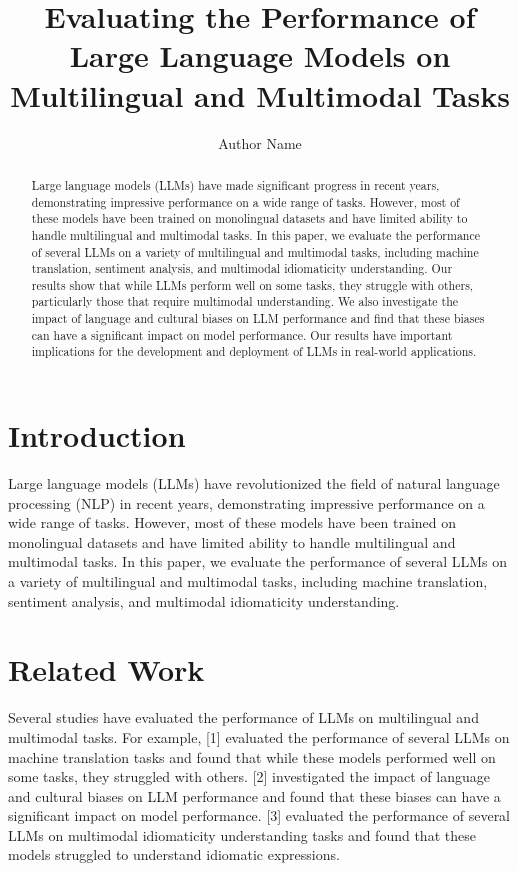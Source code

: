 \documentclass{article}
\begin{document}
\title{Evaluating the Performance of Large Language Models on Multilingual and Multimodal Tasks}

\author{Author Name}

\maketitle

\begin{abstract}
Large language models (LLMs) have made significant progress in recent years, demonstrating impressive performance on a wide range of tasks. However, most of these models have been trained on monolingual datasets and have limited ability to handle multilingual and multimodal tasks. In this paper, we evaluate the performance of several LLMs on a variety of multilingual and multimodal tasks, including machine translation, sentiment analysis, and multimodal idiomaticity understanding. Our results show that while LLMs perform well on some tasks, they struggle with others, particularly those that require multimodal understanding. We also investigate the impact of language and cultural biases on LLM performance and find that these biases can have a significant impact on model performance. Our results have important implications for the development and deployment of LLMs in real-world applications.
\end{abstract}

\section{Introduction}
Large language models (LLMs) have revolutionized the field of natural language processing (NLP) in recent years, demonstrating impressive performance on a wide range of tasks. However, most of these models have been trained on monolingual datasets and have limited ability to handle multilingual and multimodal tasks. In this paper, we evaluate the performance of several LLMs on a variety of multilingual and multimodal tasks, including machine translation, sentiment analysis, and multimodal idiomaticity understanding.

\section{Related Work}
Several studies have evaluated the performance of LLMs on multilingual and multimodal tasks. For example, [1] evaluated the performance of several LLMs on machine translation tasks and found that while these models performed well on some tasks, they struggled with others. [2] investigated the impact of language and cultural biases on LLM performance and found that these biases can have a significant impact on model performance. [3] evaluated the performance of several LLMs on multimodal idiomaticity understanding tasks and found that these models struggled to understand idiomatic expressions.
\end{document}
